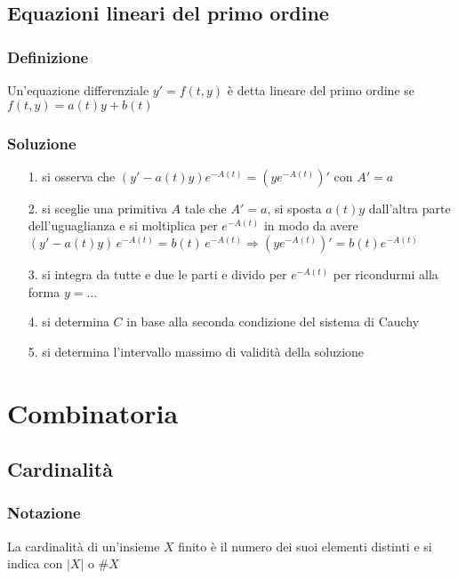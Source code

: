 \documentclass[a4paper]{article}
\begin{document}
\subsection{Equazioni lineari del primo ordine}
\subsubsection*{Definizione}
Un'equazione differenziale \(y' = f(t,y)\) è detta lineare del primo ordine se \(f(t,y) = a(t)y + b(t)\)

\subsubsection*{Soluzione}
\begin{itemize}[topsep=3pt, itemsep=0pt]
	\item[1.] si osserva che \((y'-a(t)y)e^{-A(t)} = (y e^{-A(t)})'\) con \(A' = a\)
	\item[2.] si sceglie una primitiva \(A\) tale che \(A' = a\), si sposta \(a(t)y\) dall'altra parte dell'uguaglianza e si
	moltiplica per \(e^{-A(t)}\) in modo da avere \((y'-a(t)y) \, e^{-A(t)} = b(t) \, e^{-A(t)} \Rightarrow (y e^{-A(t)})' = b(t) e^{-A(t)}\)
	\item[3.] si integra da tutte e due le parti e divido per \(e^{-A(t)}\) per ricondurmi alla forma \(y = \dots\)
	\item[4.] si determina \(C\) in base alla seconda condizione del sistema di Cauchy
	\item[5.] si determina l'intervallo massimo di validità della soluzione
\end{itemize}

\newpage

\section{Combinatoria}
\subsection{Cardinalità}
\subsubsection*{Notazione}
La cardinalità di un'insieme \(X\) finito è il numero dei suoi elementi distinti e si indica con \(|X|\) o \(\#X\)
\end{document}
